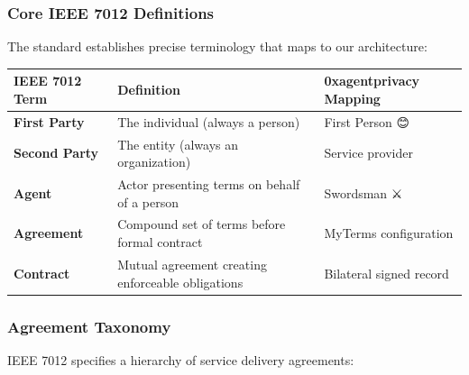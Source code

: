 \documentclass[
]{article}
\newcounter{none} %
\begin{document}
\subsubsection{Core IEEE 7012
Definitions}\label{core-ieee-7012-definitions}

The standard establishes precise terminology that maps to our
architecture:

{\def\LTcaptype{none} %
\begin{longtable}[]{@{}
  >{\raggedright\arraybackslash}p{}
  >{\raggedright\arraybackslash}p{}
  >{\raggedright\arraybackslash}p{}@{}}
\toprule\noalign{}
\begin{minipage}[b]{\linewidth}\raggedright
IEEE 7012 Term
\end{minipage} & \begin{minipage}[b]{\linewidth}\raggedright
Definition
\end{minipage} & \begin{minipage}[b]{\linewidth}\raggedright
0xagentprivacy Mapping
\end{minipage} \\
\midrule\noalign{}
\endhead
\bottomrule\noalign{}
\endlastfoot
\textbf{First Party} & The individual (always a person) & First Person
😊 \\
\textbf{Second Party} & The entity (always an organization) & Service
provider \\
\textbf{Agent} & Actor presenting terms on behalf of a person &
Swordsman ⚔️ \\
\textbf{Agreement} & Compound set of terms before formal contract &
MyTerms configuration \\
\textbf{Contract} & Mutual agreement creating enforceable obligations &
Bilateral signed record \\
\end{longtable}
}

\subsubsection{Agreement Taxonomy}\label{agreement-taxonomy}

IEEE 7012 specifies a hierarchy of service delivery agreements:
\end{document}
